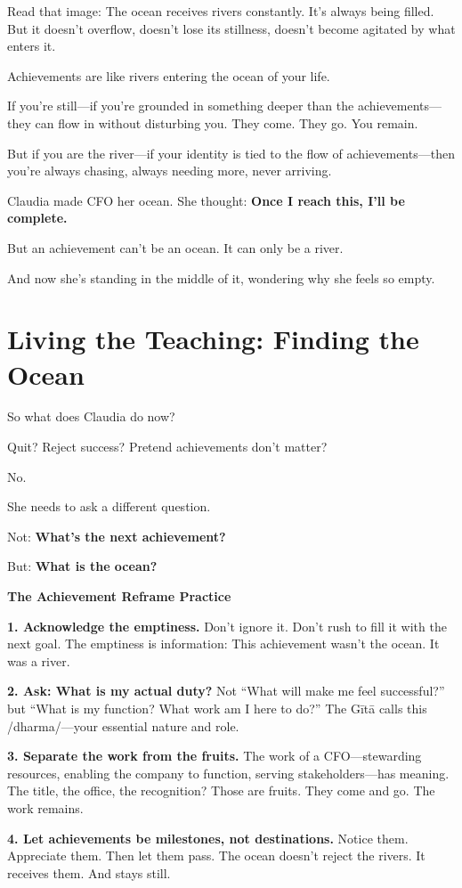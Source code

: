 \documentclass[11pt,twoside]{book}
\begin{document}
Read that image: The ocean receives rivers constantly. It's always being filled. But it doesn't overflow, doesn't lose its stillness, doesn't become agitated by what enters it.

Achievements are like rivers entering the ocean of your life.

If you're still—if you're grounded in something deeper than the achievements—they can flow in without disturbing you. They come. They go. You remain.

But if you are the river—if your identity is tied to the flow of achievements—then you're always chasing, always needing more, never arriving.

Claudia made CFO her ocean. She thought: \textbf{Once I reach this, I'll be complete.}

But an achievement can't be an ocean. It can only be a river.

And now she's standing in the middle of it, wondering why she feels so empty.

\section*{Living the Teaching: Finding the Ocean}

So what does Claudia do now?

Quit? Reject success? Pretend achievements don't matter?

No.

She needs to ask a different question.

Not: \textbf{What's the next achievement?}

But: \textbf{What is the ocean?}

\begin{practicebox}
\textbf{The Achievement Reframe Practice}

\textbf{1. Acknowledge the emptiness.}
Don't ignore it. Don't rush to fill it with the next goal. The emptiness is information: This achievement wasn't the ocean. It was a river.

\textbf{2. Ask: What is my actual duty?}
Not ``What will make me feel successful?'' but ``What is my function? What work am I here to do?'' The Gītā calls this /dharma/—your essential nature and role.

\textbf{3. Separate the work from the fruits.}
The work of a CFO—stewarding resources, enabling the company to function, serving stakeholders—has meaning. The title, the office, the recognition? Those are fruits. They come and go. The work remains.

\textbf{4. Let achievements be milestones, not destinations.}
Notice them. Appreciate them. Then let them pass. The ocean doesn't reject the rivers. It receives them. And stays still.
\end{practicebox}
\end{document}
